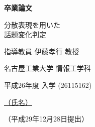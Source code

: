 \begin{titlepage}%

\def\title{分散表現を用いた\\話題変化判定}
\def\author{芳野 魁}
\def\year{29}
\def\number{26115162}
\def\kyoukan{伊藤孝行}
\def\kyoukanrank{教授}
\def\teisyutubi{平成29年12月28日}

\pagestyle{empty}
\baselineskip=18pt

\begin{center}

\vspace*{2cm}

{\huge \textbf{卒業論文}}

\vspace*{3cm}





\vrule width 6.25cm height 6pt depth -2pt
\vrule width 6.25cm height 6pt depth -2pt

{\LARGE {\title}}

\vspace{1zh}
\vrule width 14cm height 4pt depth 0pt

\vspace*{1cm}

指導教員 {\large {\kyoukan}} {\kyoukanrank}

\vfill

{\large 名古屋工業大学 情報工学科}

{\large 平成26年度 入学 ({\number})}

\vspace*{1cm}


\underline{（氏名）\hspace{3zw}{\huge\mc {\author}}\hspace{3zw}}

\vspace*{1cm}

（{\teisyutubi}提出）

\vspace{2cm}
\end{center}

\end{titlepage}%